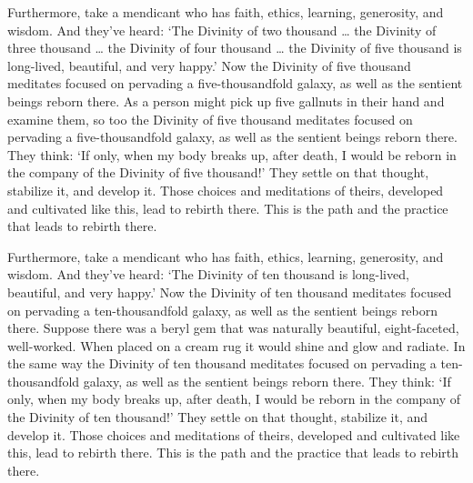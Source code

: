 \documentclass[12pt,openany]{book}%
\begin{document}
Furthermore, take a mendicant who has faith, ethics, learning, generosity, and wisdom. And they’ve heard: ‘The Divinity of two thousand … the Divinity of three thousand … the Divinity of four thousand … the Divinity of five thousand is long-lived, beautiful, and very happy.’ Now the Divinity of five thousand meditates focused on pervading a five-thousandfold galaxy, as well as the sentient beings reborn there. As a person might pick up five gallnuts in their hand and examine them, so too the Divinity of five thousand meditates focused on pervading a five-thousandfold galaxy, as well as the sentient beings reborn there. They think: ‘If only, when my body breaks up, after death, I would be reborn in the company of the Divinity of five thousand!’ They settle on that thought, stabilize it, and develop it. Those choices and meditations of theirs, developed and cultivated like this, lead to rebirth there. This is the path and the practice that leads to rebirth there. 

Furthermore, take a mendicant who has faith, ethics, learning, generosity, and wisdom. And they’ve heard: ‘The Divinity of ten thousand is long-lived, beautiful, and very happy.’ Now the Divinity of ten thousand meditates focused on pervading a ten-thousandfold galaxy, as well as the sentient beings reborn there. Suppose there was a beryl gem that was naturally beautiful, eight-faceted, well-worked. When placed on a cream rug it would shine and glow and radiate. In the same way the Divinity of ten thousand meditates focused on pervading a ten-thousandfold galaxy, as well as the sentient beings reborn there. They think: ‘If only, when my body breaks up, after death, I would be reborn in the company of the Divinity of ten thousand!’ They settle on that thought, stabilize it, and develop it. Those choices and meditations of theirs, developed and cultivated like this, lead to rebirth there. This is the path and the practice that leads to rebirth there. 
\end{document}
